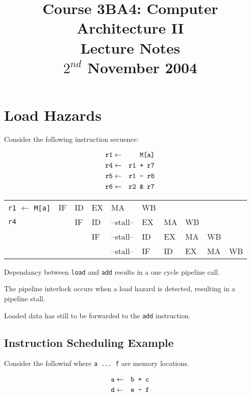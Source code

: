 \documentclass[a4paper,12pt]{article}
\begin{document}
\title{Course 3BA4: Computer Architecture II \\ Lecture Notes \\ $2^{nd}$ November 2004}

\maketitle

\section*{Load Hazards}

Consider the following instruction secuence:

\begin{eqnarray*}
\verb!r1! 	& 	\leftarrow 	&	\verb!M[a]! 	\\
\verb!r4! 	& 	\leftarrow	&	\verb!r1 + r7! \\
\verb!r5!	&	\leftarrow	&	\verb!r1 - r8! \\
\verb!r6!	&	\leftarrow	&	\verb!r2 & r7!	\\
\end{eqnarray*}

\begin{tabular}{l|l|l|l|l|l|l|l|l|l}
\verb!r1! $\leftarrow$ \verb!M[a]!	& IF	& ID	& EX	& MA			& WB	& 		&		&		&	\\
\verb!r4!									&		& IF	& ID	& --stall--	& EX	& MA	& WB	&		&	\\
												&		&		& IF	& --stall-- & ID	& EX	& MA	& WB	&	\\
												&		&		&		& --stall--	& IF	& ID	& EX	& MA	& WB \\
\end{tabular}

Dependancy between \verb!load! and \verb!add! results in a one cycle
pipeline call.


The pipeline interlock occurs when a load hazard is detected, resulting
in a pipeline stall.

Loaded data has still to be forwarded to the \verb!add! instruction.


\subsection*{Instruction Scheduling Example}

Consider the followinf where \verb!a ... f! are memory locations.

\begin{eqnarray*}
\verb!a!	& 	\leftarrow 	&	\verb!b + c! \\
\verb!d! &	\leftarrow	&	\verb!e - f! \\
\end{eqnarray*}
\end{document}
